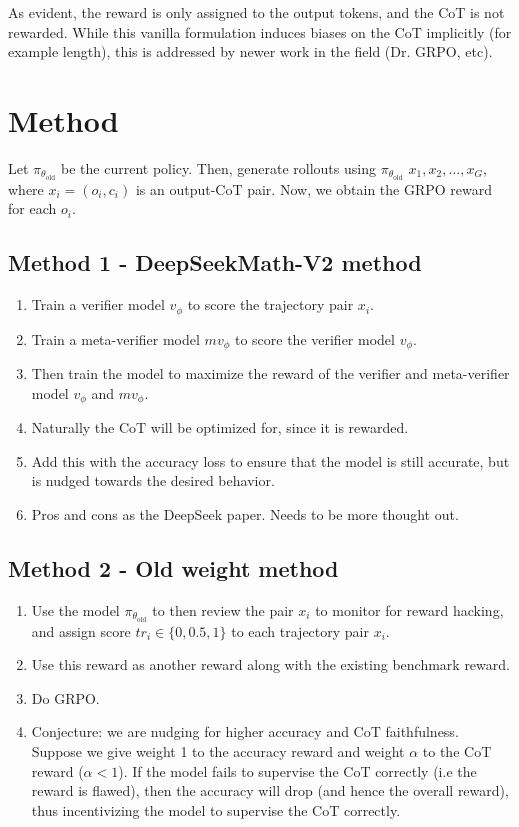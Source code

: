 \documentclass[11pt]{article}
\theoremstyle{plain}
\theoremstyle{definition}
\theoremstyle{remark}
\newcommand{\1}{\mathbf{1}}
\begin{document}
As evident, the reward is only assigned to the output tokens, and the CoT is not rewarded. While this vanilla formulation induces biases on the CoT implicitly (for example length), this is addressed by newer work in the field (Dr. GRPO, etc).

\section{Method}

Let $\pi_{\theta_\mathrm{old}}$ be the current policy. Then, generate rollouts using $\pi_{\theta_\mathrm{old}}$ $x_1, x_2, \ldots, x_G$, where $x_i = (o_i, c_i)$ is an output-CoT pair. Now, we obtain the GRPO reward for each $o_i$.


\subsection{Method 1 - DeepSeekMath-V2 method}
\begin{enumerate}
  \item Train a verifier model $v_\phi$ to score the trajectory pair $x_i$.
  \item Train a meta-verifier model $mv_\phi$ to score the verifier model $v_\phi$.
  \item Then train the model to maximize the reward of the verifier and meta-verifier model $v_\phi$ and $mv_\phi$.
  \item Naturally the CoT will be optimized for, since it is rewarded.
  \item Add this with the accuracy loss to ensure that the model is still accurate, but is nudged towards the desired behavior.
  \item Pros and cons as the DeepSeek paper. Needs to be more thought out.
\end{enumerate}

\subsection{Method 2 - Old weight method}
\begin{enumerate}
  \item Use the model $\pi_{\theta_\mathrm{old}}$ to then review the pair $x_i$ to monitor for reward hacking, and assign score $tr_i \in \{0, 0.5, 1\}$ to each trajectory pair $x_i$.
  \item Use this reward as another reward along with the existing benchmark reward.
  \item Do GRPO.
  \item Conjecture: we are nudging for higher accuracy and CoT faithfulness. Suppose we give weight 1 to the accuracy reward and weight $\alpha$ to the CoT reward ($\alpha < 1$). If the model fails to supervise the CoT correctly (i.e the reward is flawed), then the accuracy will drop (and hence the overall reward), thus incentivizing the model to supervise the CoT correctly.

\end{enumerate}
\end{document}
